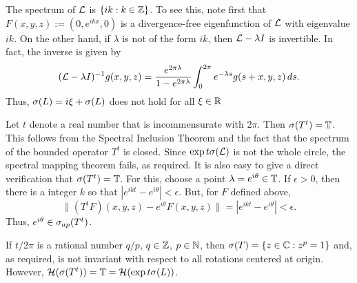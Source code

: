 The spectrum of ${\cal{L}}$ is $\{ik : k\in{\Bbb{Z}}\}$. To see this, 
note first that $F(x,y,z):=(0,e^{ikx},0)$
is a divergence-free eigenfunction of ${\cal{L}}$ with eigenvalue $ik$.
On the other hand, if $\lambda$ is not of the form $ik$, then
${\cal{L}}-\lambda I$ is invertible. In fact, the inverse is given by
\[
({\cal{L}}-\lambda I)^{-1}g(x,y,z)=\frac{e^{2\pi\lambda}}{1-e^{2\pi\lambda}}
\int_0^{2\pi}e^{-\lambda s}g(s+x,y,z)\,ds.
\]
Thus, $\sigma(L)=i\xi+\sigma(L)$ does not hold
for all $\xi\in{\Bbb{R}}$

Let $t$ denote a real number that is incommensurate with $2\pi$.
Then $\sigma(T^t)={\Bbb{T}}$.
This follows from the Spectral Inclusion Theorem and the fact that
the spectrum of the bounded operator $T^t$ is closed. Since
$\exp t\sigma({\cal{L}})$ is not
the whole circle, the spectral mapping theorem fails, as required. 
It is also easy to give a direct verification that $\sigma(T^t)={\Bbb{T}}$.
 For this,
choose a point $\lambda=e^{i\theta}\in{\Bbb{T}}$. 
If $\epsilon>0$, then there is a integer $k$ so that
$|e^{ikt}-e^{i\theta}|<\epsilon$. But, for $F$ defined above,
\[\|(T^tF)(x,y,z)-e^{i\theta}F(x,y,z)\|=|e^{ikt}-e^{i\theta}|<\epsilon.\] 
Thus, $e^{i\theta}\in\sigma_{ap}(T^t)$.

If $t/2\pi$ is a rational number $q/p$, $q\in{\Bbb{Z}}$, $p\in{\Bbb{N}}$,
then $\sigma(T)=\{z\in{\Bbb{C}}:z^p=1\}$  and, as required, 
is not  invariant with respect
to all rotations centered at origin. 
However, ${\cal{H}}(\sigma(T^t))={\Bbb{T}}={\cal{H}}(\exp t\sigma(L))$.


